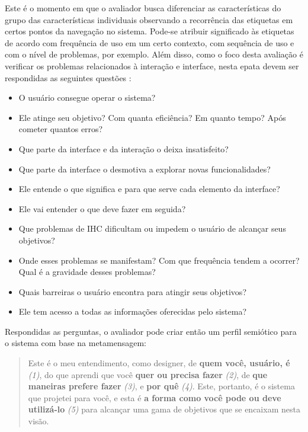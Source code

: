 \indent Este é o momento em que o avaliador busca diferenciar as características do grupo das características individuais observando a recorrência das etiquetas em certos pontos da navegação no sistema. Pode-se atribuir significado às etiquetas de acordo com frequência de uso em um certo contexto, com sequência de uso e com o nível de problemas, por exemplo. Além disso, como o foco desta avaliação é verificar os problemas relacionados à interação e interface, nesta epata devem ser respondidas as seguintes questões \cite[p. 293]{IHCbook}:
\begin{itemize}
\item O usuário consegue operar o sistema?
\item Ele atinge seu objetivo? Com quanta eficiência? Em quanto tempo? Após cometer quantos erros?
\item Que parte da interface e da interação o deixa insatisfeito?
\item Que parte da interface o desmotiva a explorar novas funcionalidades?
\item Ele entende o que significa e para que serve cada elemento da interface?
\item Ele vai entender o que deve fazer em seguida?
\item Que problemas de IHC dificultam ou impedem o usuário de alcançar seus objetivos?
\item Onde esses problemas se manifestam? Com que frequência tendem a ocorrer? Qual é a gravidade desses problemas?
\item Quais barreiras o usuário encontra para atingir seus objetivos?
\item Ele tem acesso a todas as informações oferecidas pelo sistema?
\end{itemize} 

\indent Respondidas as perguntas, o avaliador pode criar então um perfil semiótico para o sistema com base na metamensagem:

\begin{quote}
Este é o meu entendimento, como designer, de \textbf{quem você, usuário, é} \textit{(1)}, do que aprendi que você \textbf{quer ou precisa fazer} \textit{(2)}, de \textbf{que maneiras prefere fazer} \textit{(3)}, e \textbf{por quê} \textit{(4)}. Este, portanto, é o sistema que projetei para você, e esta é \textbf{a forma como você pode ou deve utilizá-lo} \textit{(5)} para alcançar uma gama de objetivos que se encaixam nesta visão. \cite[p. 356]{IHCbook}
\end{quote}

